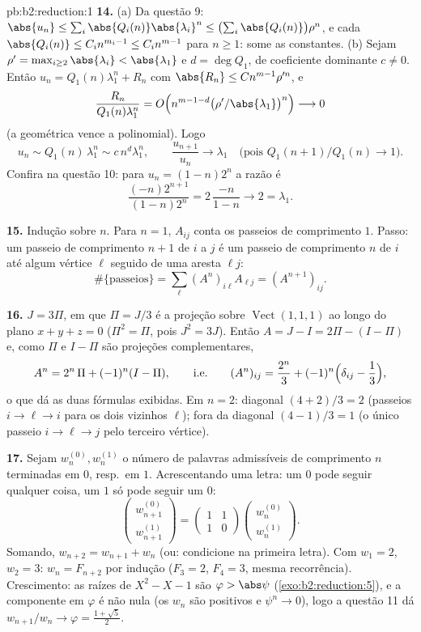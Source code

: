 \begin{solution}{pb:b2:reduction:1}
\textbf{14.} (a) Da questão 9: $\abs{u_n} \leq \sum_i
\abs{Q_i(n)}\abs{\lambda_i}^n \leq \bigl(\sum_i
\abs{Q_i(n)}\bigr)\rho^n$, e cada $\abs{Q_i(n)} \leq C_i
n^{m_i - 1} \leq C_i n^{m-1}$ para $n \geq 1$: some as constantes.
(b) Sejam $\rho' = \max_{i \geq 2}\abs{\lambda_i} <
\abs{\lambda_1}$ e $d = \deg Q_1$, de coeficiente dominante $c
\neq 0$. Então $u_n = Q_1(n)\lambda_1^n + R_n$ com $\abs{R_n}
\leq Cn^{m-1}\rho'^n$, e
\[
\frac{R_n}{Q_1(n)\lambda_1^n} = O\Bigl(n^{m-1-d}
\bigl(\rho'/\abs{\lambda_1}\bigr)^n\Bigr) \longrightarrow 0
\]
(a geométrica vence a polinomial). Logo
\[
u_n \sim Q_1(n)\,\lambda_1^n \sim c\,n^d\lambda_1^n,
\qquad
\frac{u_{n+1}}{u_n} \longrightarrow \lambda_1
\quad\text{(pois } Q_1(n{+}1)/Q_1(n) \to 1\text{)}.
\]
Confira na questão 10: para $u_n = (1-n)2^n$ a razão é
\[
\frac{(-n)2^{n+1}}{(1-n)2^n} = 2\,\frac{-n}{1-n}
\longrightarrow 2 = \lambda_1 .
\]

\textbf{15.} Indução sobre $n$. Para $n = 1$, $A_{ij}$ conta
os passeios de comprimento $1$. Passo: um passeio de comprimento $n + 1$ de $i$ a
$j$ é um passeio de comprimento $n$ de $i$ até algum vértice $\ell$
seguido de uma aresta $\ell j$:
\[
\#\{\text{passeios}\} = \sum_{\ell} (A^n)_{i\ell}A_{\ell j} =
(A^{n+1})_{ij}.
\]

\textbf{16.} $J = 3\Pi$, em que $\Pi = J/3$ é a projeção sobre
$\operatorname{Vect}(1,1,1)$ ao longo do plano $x + y + z = 0$
($\Pi^2 = \Pi$, pois $J^2 = 3J$). Então $A = J - I = 2\Pi - (I -
\Pi)$ e, como $\Pi$ e $I - \Pi$ são projeções
complementares,
\[
A^n = 2^n\,\Pi + (-1)^n (I - \Pi),
\qquad\text{i.e.}\qquad
(A^n)_{ij} = \frac{2^n}3 + (-1)^n\Bigl(\delta_{ij} -
\frac13\Bigr),
\]
o que dá as duas fórmulas exibidas. Em $n = 2$: diagonal
$(4 + 2)/3 = 2$ (passeios $i \to \ell \to i$ para os dois vizinhos
$\ell$); fora da diagonal $(4 - 1)/3 = 1$ (o único passeio $i \to
\ell \to j$ pelo terceiro vértice).

\textbf{17.} Sejam $w_n^{(0)}, w_n^{(1)}$ o número de palavras admissíveis de
comprimento $n$ terminadas em $0$, resp.\ em $1$. Acrescentando uma letra: um $0$
pode seguir qualquer coisa, um $1$ só pode seguir um $0$:
\[
\begin{pmatrix} w_{n+1}^{(0)}\\ w_{n+1}^{(1)}\end{pmatrix}
= \begin{pmatrix} 1 & 1\\ 1 & 0\end{pmatrix}
\begin{pmatrix} w_n^{(0)}\\ w_n^{(1)}\end{pmatrix}.
\]
Somando, $w_{n+2} = w_{n+1} + w_n$ (ou: condicione na primeira
letra). Com $w_1 = 2$, $w_2 = 3$: $w_n = F_{n+2}$ por indução
($F_3 = 2$, $F_4 = 3$, mesma recorrência). Crescimento: as raízes de
$X^2 - X - 1$ são $\varphi > \abs\psi$
(\cref{exo:b2:reduction:5}), e a componente em $\varphi$ é
não nula (os $w_n$ são positivos e $\psi^n \to 0$), logo a questão
11 dá $w_{n+1}/w_n \to \varphi = \frac{1 + \sqrt5}2$.


\end{solution}
